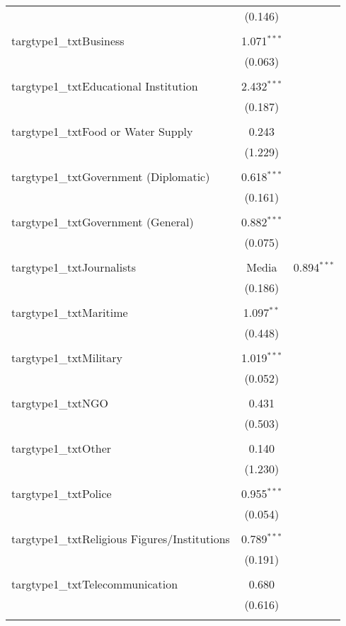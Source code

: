 \begin{table}[!htbp]
\begin{tabular}{@{\extracolsep{0.1pt}}lc}
  & (0.146) \\ 
  & \\ 
 targtype1\_txtBusiness & 1.071$^{***}$ \\ 
  & (0.063) \\ 
  & \\ 
 targtype1\_txtEducational Institution & 2.432$^{***}$ \\ 
  & (0.187) \\ 
  & \\ 
 targtype1\_txtFood or Water Supply & 0.243 \\ 
  & (1.229) \\ 
  & \\ 
 targtype1\_txtGovernment (Diplomatic) & 0.618$^{***}$ \\ 
  & (0.161) \\ 
  & \\ 
 targtype1\_txtGovernment (General) & 0.882$^{***}$ \\ 
  & (0.075) \\ 
  & \\ 
 targtype1\_txtJournalists & Media & 0.894$^{***}$ \\ 
  & (0.186) \\ 
  & \\ 
 targtype1\_txtMaritime & 1.097$^{**}$ \\ 
  & (0.448) \\ 
  & \\ 
 targtype1\_txtMilitary & 1.019$^{***}$ \\ 
  & (0.052) \\ 
  & \\ 
 targtype1\_txtNGO & 0.431 \\ 
  & (0.503) \\ 
  & \\ 
 targtype1\_txtOther & 0.140 \\ 
  & (1.230) \\ 
  & \\ 
 targtype1\_txtPolice & 0.955$^{***}$ \\ 
  & (0.054) \\ 
  & \\ 
 targtype1\_txtReligious Figures/Institutions & 0.789$^{***}$ \\ 
  & (0.191) \\ 
  & \\ 
 targtype1\_txtTelecommunication & 0.680 \\ 
  & (0.616) \\ 
  & \\ 

\end{tabular}
\end{table}
